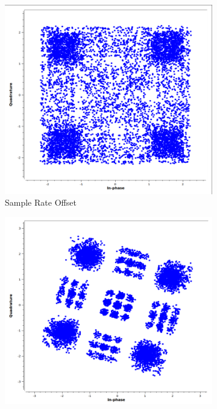 \documentclass{article}
\begin{document}
\begin{figure}
    \centering
    \begin{subfigure}[b]{0.475\textwidth}
        \centering
        \includegraphics[width=\textwidth]{sro.png}
        \caption[]%
        {{\small Sample Rate Offset}}    
        \label{fig:sro}
    \end{subfigure}
    \hfill
    \begin{subfigure}[b]{0.475\textwidth}  
        \centering 
        \includegraphics[width=\textwidth]{cfo.png}

\end{subfigure}
\end{figure}
\end{document}
